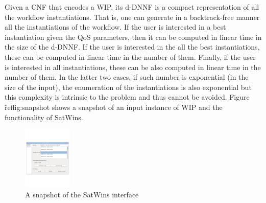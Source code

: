 \documentclass{llncs}
\begin{document}
Given a CNF that encodes a WIP, its d-DNNF is a compact representation of
all the workflow instantiations. That is, one can generate in a backtrack-free
manner all the instantiations of the workflow. If the user is interested in
a best instantiation given the QoS parameters, then it can be computed in
linear time in the size of the d-DNNF. If the user is interested in the 
all the best instantiations, these can be computed in linear time in the
number of them. Finally, if the user is interested in all instantiations,
these can be also computed in linear time in the number of them.
In the latter two cases, if such number is exponential (in the size of the
input), the enumeration of the instantiations is also exponential but
this complexity is intrinsic to the problem and thus cannot be avoided. Figure \~ref{fig:snapshot} shows a snapshot of an input instance of WIP and the functionality of SatWins. 

\begin{figure}[t]
\centering
\includegraphics[height=30mm,width=.7\textwidth]{demo}
\caption{A snapshot of the SatWins interface}
\label{fig:snapshot}
\end{figure}
\end{document}
